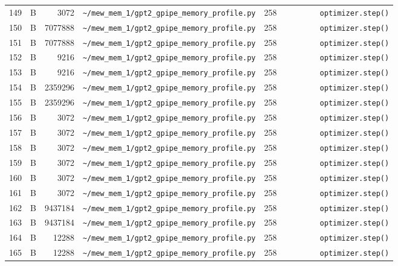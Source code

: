\documentclass{article}
\begin{document}
\begin{longtable}{r l r p{6.5cm} r p{7.0cm}}
149 & B & 3072 & \lstinline|~/mew_mem_1/gpt2_gpipe_memory_profile.py| & 258 & \lstinline|        optimizer.step()| \\
150 & B & 7077888 & \lstinline|~/mew_mem_1/gpt2_gpipe_memory_profile.py| & 258 & \lstinline|        optimizer.step()| \\
151 & B & 7077888 & \lstinline|~/mew_mem_1/gpt2_gpipe_memory_profile.py| & 258 & \lstinline|        optimizer.step()| \\
152 & B & 9216 & \lstinline|~/mew_mem_1/gpt2_gpipe_memory_profile.py| & 258 & \lstinline|        optimizer.step()| \\
153 & B & 9216 & \lstinline|~/mew_mem_1/gpt2_gpipe_memory_profile.py| & 258 & \lstinline|        optimizer.step()| \\
154 & B & 2359296 & \lstinline|~/mew_mem_1/gpt2_gpipe_memory_profile.py| & 258 & \lstinline|        optimizer.step()| \\
155 & B & 2359296 & \lstinline|~/mew_mem_1/gpt2_gpipe_memory_profile.py| & 258 & \lstinline|        optimizer.step()| \\
156 & B & 3072 & \lstinline|~/mew_mem_1/gpt2_gpipe_memory_profile.py| & 258 & \lstinline|        optimizer.step()| \\
157 & B & 3072 & \lstinline|~/mew_mem_1/gpt2_gpipe_memory_profile.py| & 258 & \lstinline|        optimizer.step()| \\
158 & B & 3072 & \lstinline|~/mew_mem_1/gpt2_gpipe_memory_profile.py| & 258 & \lstinline|        optimizer.step()| \\
159 & B & 3072 & \lstinline|~/mew_mem_1/gpt2_gpipe_memory_profile.py| & 258 & \lstinline|        optimizer.step()| \\
160 & B & 3072 & \lstinline|~/mew_mem_1/gpt2_gpipe_memory_profile.py| & 258 & \lstinline|        optimizer.step()| \\
161 & B & 3072 & \lstinline|~/mew_mem_1/gpt2_gpipe_memory_profile.py| & 258 & \lstinline|        optimizer.step()| \\
162 & B & 9437184 & \lstinline|~/mew_mem_1/gpt2_gpipe_memory_profile.py| & 258 & \lstinline|        optimizer.step()| \\
163 & B & 9437184 & \lstinline|~/mew_mem_1/gpt2_gpipe_memory_profile.py| & 258 & \lstinline|        optimizer.step()| \\
164 & B & 12288 & \lstinline|~/mew_mem_1/gpt2_gpipe_memory_profile.py| & 258 & \lstinline|        optimizer.step()| \\
165 & B & 12288 & \lstinline|~/mew_mem_1/gpt2_gpipe_memory_profile.py| & 258 & \lstinline|        optimizer.step()| \\

\end{longtable}
\end{document}

